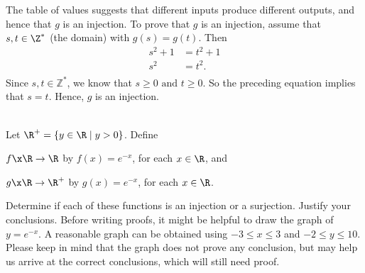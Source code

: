 \begin{example}
The table of values suggests that different inputs produce different outputs, and hence that  $g$  is an injection.  To prove that  $g$  is an injection,  assume that  
$s, t \in \Z^* $ (the domain) with  $g( s ) = g( t )$.  Then
\begin{align*}
  s^2  + 1 &= t^2  + 1 \\ 
      s^2  &= t^2.  \\ 
\end{align*}
Since  $s, t \in \mathbb{Z}^* $, we know that  $s \geq 0\text{ and }t \geq 0$.  So the preceding equation implies that  $s = t$.  Hence,  $g$  is an injection.
\end{example}
%
\begin{center}
\end{center}


\begin{prog} 
\label{pr:domainandcodomain} \hfill \\
Let $\R^+ = \{ y \in \R \mid y > 0 \}$.  Define  
\begin{list}{}
\item $f \x \R \to \R$ by $f(x) = e^{-x}$, for each $x \in \R$, and
\item $g \x \R \to \R^+$ by $g(x) = e^{-x}$, for each $x \in \R$.
\end{list}
\end{prog}
Determine if each of these functions is an injection or a surjection.  Justify your conclusions.  \note Before writing proofs, it might be helpful to draw the graph of $y = e^{-x}$.  A reasonable graph can be obtained using $-3 \leq x \leq 3$ and $-2 \leq y \leq 10$.  Please keep in mind that the graph does not prove any conclusion, but may help us  arrive at the correct conclusions, which will still need proof.
\hbreak
%

\endinput

